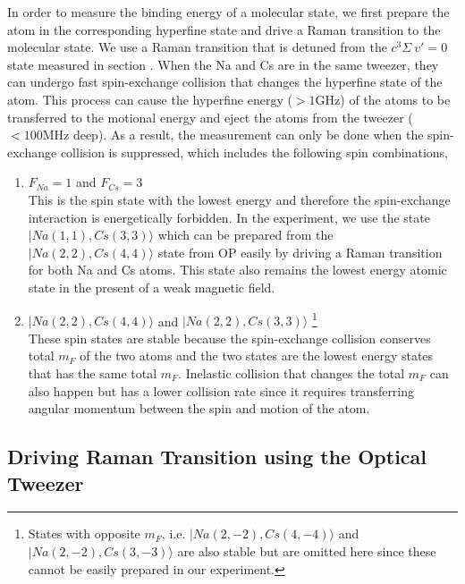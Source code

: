 In order to measure the binding energy of a molecular state,
we first prepare the atom in the corresponding hyperfine state
and drive a Raman transition to the molecular state.
We use a Raman transition that is detuned from the $c^3\Sigma\ v'=0$ state measured
in section \label{pa:pa}.
When the Na and Cs are in the same tweezer,
they can undergo fast spin-exchange collision that changes the hyperfine state of the atom.
This process can cause the hyperfine energy ($>1\mathrm{GHz}$) of the atoms
to be transferred to the motional energy
and eject the atoms from the tweezer ($<100\mathrm{MHz}$ deep).
As a result, the measurement can only be done when the spin-exchange collision is suppressed,
which includes the following spin combinations,
\begin{enumerate}
\item $F_{Na}=1$ and $F_{Cs}=3$\\
  This is the spin state with the lowest energy and therefore the spin-exchange interaction
  is energetically forbidden.
  In the experiment, we use the state $|Na(1, 1),Cs(3, 3)\rangle$
  which can be prepared from the $|Na(2, 2),Cs(4, 4)\rangle$ state from OP
  easily by driving a Raman transition for both Na and Cs atoms.
  This state also remains the lowest energy atomic state in the present of a weak magnetic field.
\item $|Na(2, 2),Cs(4, 4)\rangle$ and $|Na(2, 2),Cs(3, 3)\rangle$
  \footnote{States with opposite $m_F$, i.e.
    $|Na(2, -2),Cs(4, -4)\rangle$ and $|Na(2, -2),Cs(3, -3)\rangle$ are also stable
    but are omitted here since these cannot be easily prepared in our experiment.}\\
  These spin states are stable because the spin-exchange collision conserves total $m_F$
  of the two atoms and
  the two states are the lowest energy states that has the same total $m_F$.
  Inelastic collision that changes the total $m_F$ can also happen
  but has a lower collision rate since it requires transferring angular momentum
  between the spin and motion of the atom.
\end{enumerate}

\subsection{Driving Raman Transition using the Optical Tweezer}

